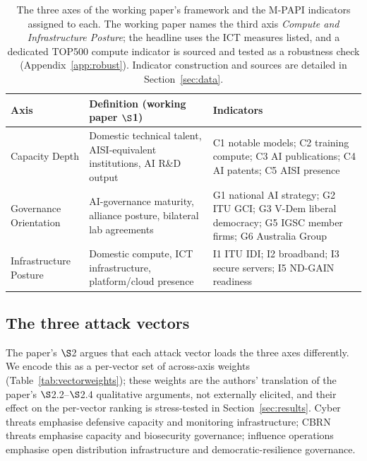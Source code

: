 \documentclass[11pt]{article}
\begin{document}
\begin{table}[t]
\centering
\caption{The three axes of the working paper's framework and the M-PAPI indicators assigned to each. The working paper names the third axis \emph{Compute and Infrastructure Posture}; the headline uses the ICT measures listed, and a dedicated TOP500 compute indicator is sourced and tested as a robustness check (Appendix~\ref{app:robust}). Indicator construction and sources are detailed in Section~\ref{sec:data}.}
\label{tab:axes}
\footnotesize
\begin{tabularx}{\textwidth}{@{}l Y Y@{}}
\toprule
\textbf{Axis} & \textbf{Definition (working paper $\S$1)} & \textbf{Indicators} \\
\midrule
Capacity Depth & Domestic technical talent, AISI-equivalent institutions, AI R\&D output & C1 notable models; C2 training compute; C3 AI publications; C4 AI patents; C5 AISI presence \\
Governance Orientation & AI-governance maturity, alliance posture, bilateral lab agreements & G1 national AI strategy; G2 ITU GCI; G3 V-Dem liberal democracy; G5 IGSC member firms; G6 Australia Group \\
Infrastructure Posture & Domestic compute, ICT infrastructure, platform/cloud presence & I1 ITU IDI; I2 broadband; I3 secure servers; I5 ND-GAIN readiness \\
\bottomrule
\end{tabularx}
\end{table}

\subsection{The three attack vectors}
The paper's $\S$2 argues that each attack vector loads the three axes differently. We encode this as a per-vector set of across-axis weights (Table~\ref{tab:vectorweights}); these weights are the authors' translation of the paper's $\S$2.2--$\S$2.4 qualitative arguments, not externally elicited, and their effect on the per-vector ranking is stress-tested in Section~\ref{sec:results}. Cyber threats emphasise defensive capacity and monitoring infrastructure; CBRN threats emphasise capacity and biosecurity governance; influence operations emphasise open distribution infrastructure and democratic-resilience governance.
\end{document}
